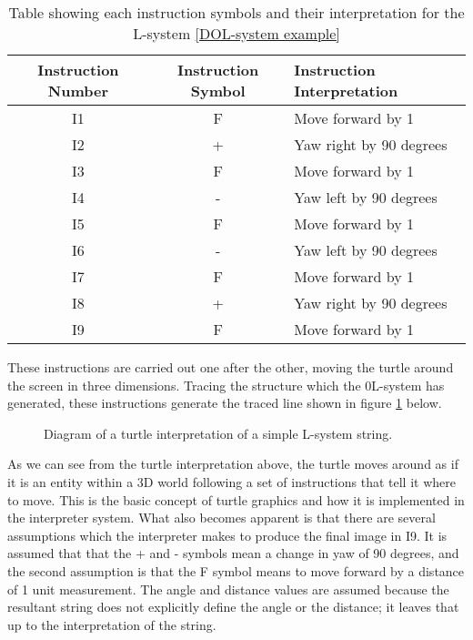 \begin{table}[h!]
\centering
\begin{tabular}{ | c | c | l | }
\hline
	 	Instruction Number & Instruction Symbol & Instruction Interpretation \\  
\hline
\hline
	I1 						& F & Move forward by 1\\
\hline
	I2						& + & Yaw right by 90 degrees\\
\hline
	I3						& F & Move forward by 1\\
\hline
	I4						& - & Yaw left by 90 degrees \\
\hline
	I5						& F & Move forward by 1\\
\hline
	I6 						& - & Yaw left by 90 degrees \\
\hline
	I7 						& F & Move forward by 1\\
\hline
	I8 						& + & Yaw right by 90 degrees\\
\hline
	I9 						& F & Move forward by 1\\
\hline
\end{tabular}
\caption{Table showing each instruction symbols and their interpretation for the L-system \ref{DOL-system example}}
\label{Instruction Interpretation}
\end{table}
\FloatBarrier

\noindent
These instructions are carried out one after the other, moving the turtle around the screen in three dimensions. Tracing the structure which the 0L-system has generated, these instructions generate the traced line shown in figure \ref{basic turtle} below.

\begin{figure}[htbp]
	{\centering
		\setlength{\fboxrule}{1pt}
		\vspace{7px}
		\caption{Diagram of a turtle interpretation of a simple L-system string.} \label{basic turtle}
	}
\end{figure}
\FloatBarrier

\noindent
As we can see from the turtle interpretation above, the turtle moves around as if it is an entity within a 3D world following a set of instructions that tell it where to move. This is the basic concept of turtle graphics and how it is implemented in the interpreter system. What also becomes apparent is that there are several assumptions which the interpreter makes to produce the final image in I9. It is assumed that that the + and - symbols mean a change in yaw of 90 degrees, and the second assumption is that the F symbol means to move forward by a distance of 1 unit measurement. The angle and distance values are assumed because the resultant string does not explicitly define the angle or the distance; it leaves that up to the interpretation of the string. 

